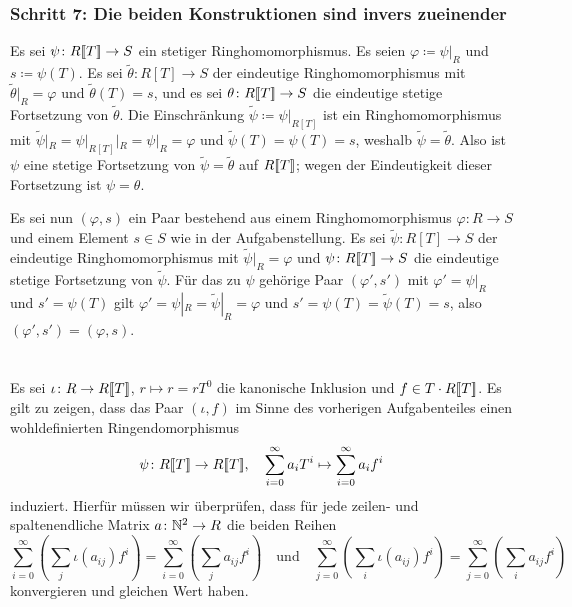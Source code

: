 \documentclass[a4paper, 10pt, numbers=noenddot]{scrartcl}
\begin{document}
\subsubsection*{Schritt 7: Die beiden Konstruktionen sind invers zueinender}
Es sei $\psi \colon R[\![T]\!] \to S$ ein stetiger Ringhomomorphismus.
Es seien $\varphi \coloneqq \psi|_R$ und $s \coloneqq \psi(T)$.
Es sei $\tilde{\theta} \colon R[T] \to S$ der eindeutige Ringhomomorphismus mit $\tilde{\theta}|_R = \varphi$ und $\tilde{\theta}(T) = s$, und es sei $\theta \colon R[\![T]\!] \to S$ die eindeutige stetige Fortsetzung von $\tilde{\theta}$.
Die Einschränkung $\tilde{\psi} \coloneqq \psi|_{R[T]}$ ist ein Ringhomomorphismus mit $\tilde{\psi}|_R = \psi|_{R[T]}|_R = \psi|_R = \varphi$ und $\tilde{\psi}(T) = \psi(T) = s$, weshalb $\tilde{\psi} = \tilde{\theta}$.
Also ist $\psi$ eine stetige Fortsetzung von $\tilde{\psi} = \tilde{\theta}$ auf $R[\![T]\!]$; wegen der Eindeutigkeit dieser Fortsetzung ist $\psi = \theta$.

Es sei nun $(\varphi, s)$ ein Paar bestehend aus einem Ringhomomorphismus $\varphi \colon R \to S$ und einem Element $s \in S$ wie in der Aufgabenstellung.
Es sei $\tilde{\psi} \colon R[T] \to S$ der eindeutige Ringhomomorphismus mit $\tilde{\psi}|_R = \varphi$ und $\psi \colon R[\![T]\!] \to S$ die eindeutige stetige Fortsetzung von $\tilde{\psi}$.
Für das zu $\psi$ gehörige Paar $(\varphi', s')$ mit $\varphi' = \psi|_R$ und $s' = \psi(T)$ gilt $\varphi' = \psi|_R = \tilde{\psi}|_R = \varphi$ und $s' = \psi(T) = \tilde{\psi}(T) = s$, also $(\varphi', s') = (\varphi, s)$.





\section{}

Es sei $\iota \colon R \to R[\![T]\!]$, $r \mapsto r = r T^0$ die kanonische Inklusion und $f \in T \cdot R[\![T]\!]$.
Es gilt zu zeigen, dass das Paar $(\iota, f)$ im Sinne des vorherigen Aufgabenteiles einen wohldefinierten Ringendomorphismus
\[
  \psi \colon R[\![T]\!] \to R[\![T]\!],
  \quad
  \sum_{i=0}^\infty a_i T^i \mapsto \sum_{i=0}^\infty a_i f^i
\]
induziert.
Hierfür müssen wir überprüfen, dass für jede zeilen- und spaltenendliche Matrix $a \colon \mathbb{N}^2 \to R$ die beiden Reihen
\[
    \sum_{i=0}^\infty \left( \sum_j \iota(a_{ij}) f^i \right)
  = \sum_{i=0}^\infty \left( \sum_j a_{ij} f^i \right)
  \quad\text{und}\quad
    \sum_{j=0}^\infty \left( \sum_i \iota(a_{ij}) f^i \right)
  = \sum_{j=0}^\infty \left( \sum_i a_{ij} f^i \right)
\]
konvergieren und gleichen Wert haben.
\end{document}
